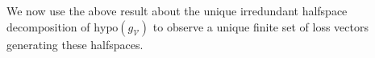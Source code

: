 \documentclass[11pt]{article}
\newcommand{\Comments}{1}
\newcommand{\mynote}[2]{\ifnum\Comments=1\textcolor{#1}{#2}\fi}
\newcommand{\jessie}[1]{\mynote{teal}{[JF: #1]}}
\newcommand{\reals}{\mathbb{R}}
\renewcommand{\H}{\mathcal{H}}
\newcommand{\V}{\mathcal{V}}
\newcommand{\Y}{\mathcal{Y}}
\newcommand{\hyp}{\mathrm{hypo}}
\newtheorem{lemma}{Lemma}
\begin{document}

%  
%

We now use the above result about the unique irredundant halfspace decomposition of $\hyp(g_\V)$ to observe a unique finite set of loss vectors generating these halfspaces.
\end{document}
